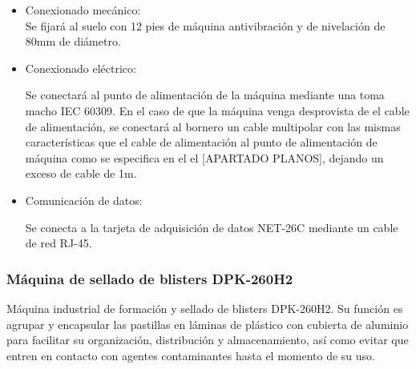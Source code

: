 		\begin{itemize}
				\item{Conexionado mecánico:}\\
				
				Se fijará al suelo con 12 pies de máquina antivibración y de nivelación de 80mm de diámetro.

				\item{Conexionado eléctrico:}

				Se conectará al punto de alimentación de la máquina mediante una  toma macho IEC 60309. En el caso de que la máquina venga desprovista de el cable de alimentación, se conectará al bornero un cable multipolar con las mismas características que el cable de alimentación al punto de alimentación de máquina como se especifica en el el [APARTADO PLANOS], dejando un exceso de cable de 1m. \
				
				\item{Comunicación de datos:}

				Se conecta a la tarjeta de adquisición de datos NET-26C mediante un cable de red RJ-45.
		\end{itemize}

    \newpage

	\subsubsection{Máquina de sellado de blisters DPK-260H2}

	
	Máquina industrial de formación y sellado de blisters DPK-260H2. Su función es agrupar y encapsular las pastillas en láminas de plástico con cubierta de aluminio para facilitar su organización, distribución y almacenamiento, así como evitar que entren en contacto con agentes contaminantes hasta el momento de su uso.\\


